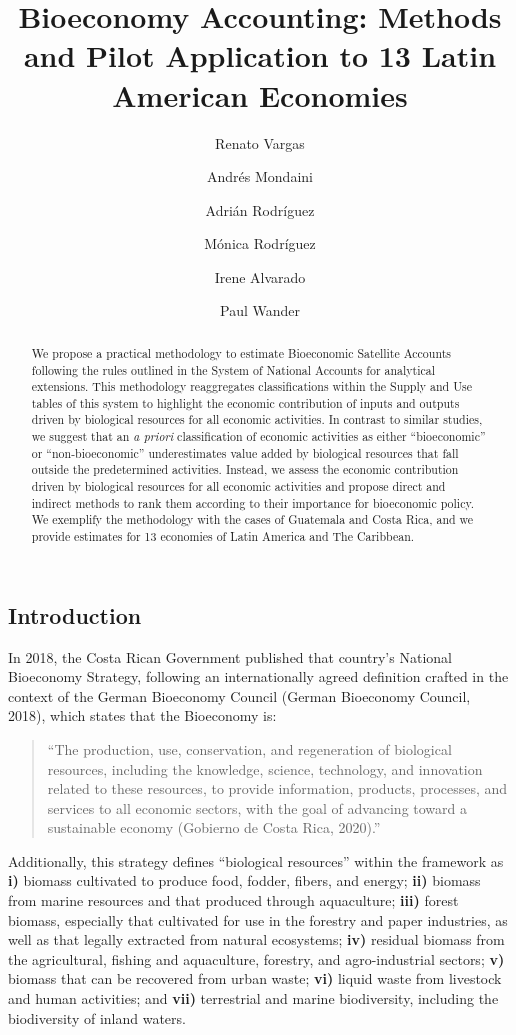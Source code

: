 \documentclass[
  letterpaper,
  DIV=11,
  numbers=noendperiod]{scrartcl}
\title{Bioeconomy Accounting: Methods and Pilot Application to 13 Latin
American Economies}
\author{Renato Vargas \and Andrés Mondaini \and Adrián
Rodríguez \and Mónica Rodríguez \and Irene Alvarado \and Paul Wander}
\date{}
\begin{document}
\maketitle
\begin{abstract}
We propose a practical methodology to estimate Bioeconomic Satellite
Accounts following the rules outlined in the System of National Accounts
for analytical extensions. This methodology reaggregates classifications
within the Supply and Use tables of this system to highlight the
economic contribution of inputs and outputs driven by biological
resources for all economic activities. In contrast to similar studies,
we suggest that an \emph{a priori} classification of economic activities
as either ``bioeconomic'' or ``non-bioeconomic'' underestimates value
added by biological resources that fall outside the predetermined
activities. Instead, we assess the economic contribution driven by
biological resources for all economic activities and propose direct and
indirect methods to rank them according to their importance for
bioeconomic policy. We exemplify the methodology with the cases of
Guatemala and Costa Rica, and we provide estimates for 13 economies of
Latin America and The Caribbean.
\end{abstract}

\subsection{Introduction}\label{introduction}

In 2018, the Costa Rican Government published that country's National
Bioeconomy Strategy, following an internationally agreed definition
crafted in the context of the German Bioeconomy Council (German
Bioeconomy Council, 2018), which states that the Bioeconomy is:

\begin{quote}
``The production, use, conservation, and regeneration of biological
resources, including the knowledge, science, technology, and innovation
related to these resources, to provide information, products, processes,
and services to all economic sectors, with the goal of advancing toward
a sustainable economy (Gobierno de Costa Rica, 2020).''
\end{quote}

Additionally, this strategy defines ``biological resources'' within the
framework as \textbf{i)} biomass cultivated to produce food, fodder,
fibers, and energy; \textbf{ii)} biomass from marine resources and that
produced through aquaculture; \textbf{iii)} forest biomass, especially
that cultivated for use in the forestry and paper industries, as well as
that legally extracted from natural ecosystems; \textbf{iv)} residual
biomass from the agricultural, fishing and aquaculture, forestry, and
agro-industrial sectors; \textbf{v)} biomass that can be recovered from
urban waste; \textbf{vi)} liquid waste from livestock and human
activities; and \textbf{vii)} terrestrial and marine biodiversity,
including the biodiversity of inland waters.
\end{document}

